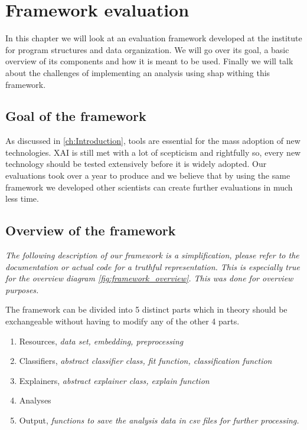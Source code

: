 \chapter{Framework evaluation}

In this chapter we will look at an evaluation framework developed at the institute for program structures and data organization. We will go over its goal, a basic overview of its components and how it is meant to be used. Finally we will talk about the challenges of implementing an analysis using shap withing this framework.

\section{Goal of the framework}

As discussed in \autoref{ch:Introduction}, tools are essential for the mass adoption of new technologies. XAI is still met with a lot of scepticism and rightfully so, every new technology should be tested extensively before it is widely adopted. Our evaluations took over a year to produce and we believe that by using the same framework we developed other scientists can create further evaluations in much less time.

\section{Overview of the framework}

\textit{The following description of our framework is a simplification, please refer to the documentation or actual code for a truthful representation. This is especially true for the overview diagram \autoref{fig:framework_overview}. This was done for overview purposes.}


The framework can be divided into 5 distinct parts which in theory should be exchangeable without having to modify any of the other 4 parts.

\begin{enumerate}
    \item Resources, \textit{data set, embedding, preprocessing}
    \item Classifiers, \textit{abstract classifier class, fit function, classification function}
    \item Explainers, \textit{abstract explainer class, explain function}
    \item Analyses
    \item Output, \textit{functions to save the analysis data in csv files for further processing.}
\end{enumerate}

